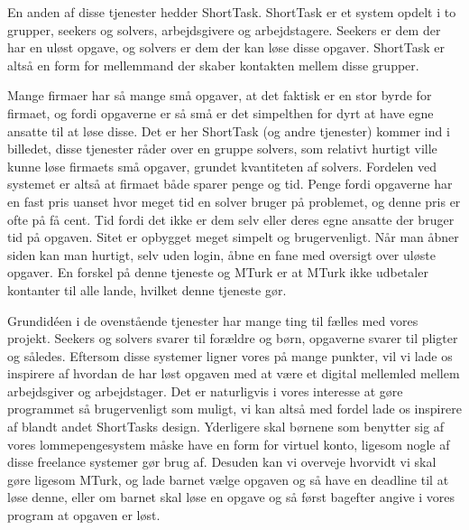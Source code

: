 En anden af disse tjenester hedder ShortTask. ShortTask er et system opdelt i to grupper, seekers og solvers, arbejdsgivere og arbejdstagere. Seekers er dem der har en uløst opgave, og solvers er dem der kan løse disse opgaver. ShortTask er altså en form for mellemmand der skaber kontakten mellem disse grupper.

Mange firmaer har så mange små opgaver, at det faktisk er en stor byrde for firmaet, og fordi opgaverne er så små er det simpelthen for dyrt at have egne ansatte til at løse disse. Det er her ShortTask (og andre tjenester) kommer ind i billedet, disse tjenester råder over en gruppe solvers, som relativt hurtigt ville kunne løse firmaets små opgaver, grundet kvantiteten af solvers. Fordelen ved systemet er altså at firmaet både sparer penge og tid. Penge fordi opgaverne har en fast pris uanset hvor meget tid en solver bruger på problemet, og denne pris er ofte på få cent. Tid fordi det ikke er dem selv eller deres egne ansatte der bruger tid på opgaven. Sitet er opbygget meget simpelt og brugervenligt. Når man åbner siden kan man hurtigt, selv uden login, åbne en fane med oversigt over uløste opgaver. En forskel på denne tjeneste og MTurk er at MTurk ikke udbetaler kontanter til alle lande, hvilket denne tjeneste gør. \cite{ShortTask}

Grundidéen i de ovenstående tjenester har mange ting til fælles med vores projekt. Seekers og solvers svarer til forældre og børn, opgaverne svarer til pligter og således. Eftersom disse systemer ligner vores på mange punkter, vil vi lade os inspirere af hvordan de har løst opgaven med at være et digital mellemled mellem arbejdsgiver og arbejdstager. Det er naturligvis i vores interesse at gøre programmet så brugervenligt som muligt, vi kan altså med fordel lade os inspirere af blandt andet ShortTasks design. Yderligere skal børnene som benytter sig af vores lommepengesystem måske have en form for virtuel konto, ligesom nogle af disse freelance systemer gør brug af. Desuden kan vi overveje hvorvidt vi skal gøre ligesom MTurk, og lade barnet vælge opgaven og så have en deadline til at løse denne, eller om barnet skal løse en opgave og så først bagefter angive i vores program at opgaven er løst.


